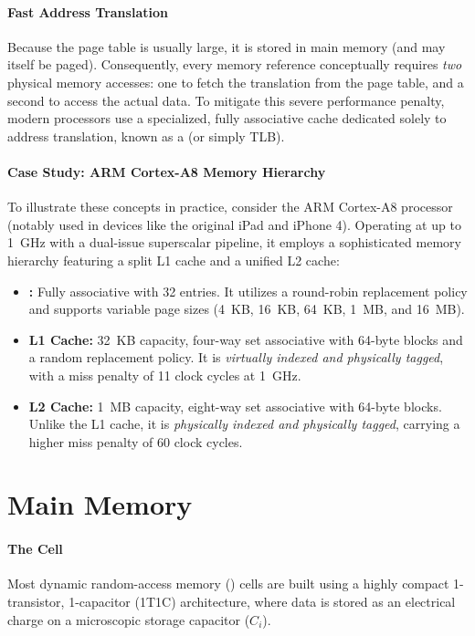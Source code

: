 \paragraph{Fast Address Translation} 
Because the page table is usually large, it is stored in main memory (and may itself be paged). Consequently, every memory reference conceptually requires \textit{two} physical memory accesses: one to fetch the translation from the page table, and a second to access the actual data. To mitigate this severe performance penalty, modern processors use a specialized, fully associative cache dedicated solely to address translation, known as a \textbf{} (or simply TLB).

\paragraph{Case Study: ARM Cortex-A8 Memory Hierarchy}
To illustrate these concepts in practice, consider the ARM Cortex-A8 processor (notably used in devices like the original iPad and iPhone 4). Operating at up to 1~GHz with a dual-issue superscalar pipeline, it employs a sophisticated memory hierarchy featuring a split L1 cache and a unified L2 cache:
\begin{itemize}
    \item \textbf{:} Fully associative with 32 entries. It utilizes a round-robin replacement policy and supports variable page sizes (4~KB, 16~KB, 64~KB, 1~MB, and 16~MB).
    \item \textbf{L1 Cache:} 32~KB capacity, four-way set associative with 64-byte blocks and a random replacement policy. It is \textit{virtually indexed and physically tagged}, with a miss penalty of 11 clock cycles at 1~GHz.
    \item \textbf{L2 Cache:} 1~MB capacity, eight-way set associative with 64-byte blocks. Unlike the L1 cache, it is \textit{physically indexed and physically tagged}, carrying a higher miss penalty of 60 clock cycles.
\end{itemize}

\section{Main Memory}

\paragraph{The  Cell}
Most dynamic random-access memory () cells are built using a highly compact 1-transistor, 1-capacitor (1T1C) architecture, where data is stored as an electrical charge on a microscopic storage capacitor (\(C_i\)). 

